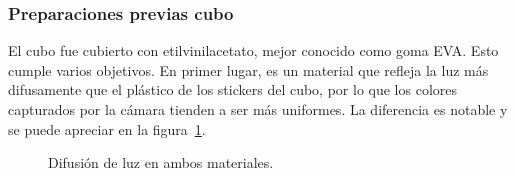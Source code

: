 \subsubsection{Preparaciones previas cubo}
El cubo fue cubierto con etilvinilacetato, mejor conocido como goma EVA. Esto cumple varios objetivos. En primer lugar, es un material que refleja la luz más difusamente que el plástico de los stickers del cubo, por lo que los colores capturados por la cámara tienden a ser más uniformes. La diferencia es notable y se puede apreciar en la figura~\ref{luz}.

\begin{figure}[h!]
	\centering
	\caption{Difusión de luz en ambos materiales.}
	\label{luz}
\end{figure}


